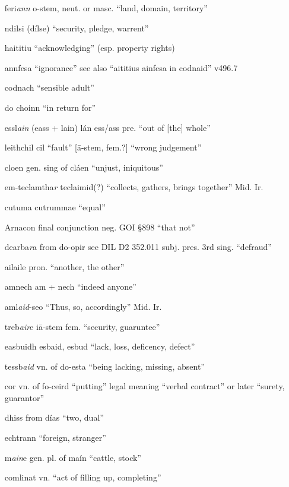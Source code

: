 \documentclass[11pt]{article}
\begin{document}
\begin{enumerate}
  \item[feri\emph{ann}] o-stem, neut. or masc. \enquote{land, domain, territory}
  \item[ndilsi] (d\'{i}lse) \enquote{security, pledge, warrent}
  \item[haititiu] \enquote{acknowledging} (esp. property rights)
  \item[annfesa] \enquote{ignorance} see also \enquote{aititius ainfesa in codnaid} v496.7
  \item[codnach] \enquote{sensible adult}
  \item[do choinn] \enquote{in return for}
  \item[essl\emph{ain}] (eass + lain) l\'{a}n ess/ass pre. \enquote{out of [the] whole}
  \item[leithchil] cil \enquote{fault} [\={a}-stem, fem.?] \enquote{wrong judgement}
  \item[cloen] gen. sing of cl\'{a}en \enquote{unjust, iniquitous}
  \item[em-teclamtha\emph{r}] teclaimid(?) \enquote{collects, gathers, brings together} Mid. Ir.
  \item[cutuma] cutrummae \enquote{equal}
  \item[Arnacon] final conjunction neg. GOI \S 898 \enquote{that not}
  \item[dearba\emph{r}a] from do-opir see DIL D2 352.011 subj. pres. 3rd sing. \enquote{defraud} 
  \item[ailaile] pron. \enquote{another, the other}
  \item[amnech] am + nech \enquote{indeed anyone} 
  \item[aml\emph{aid}-seo] \enquote{Thus, so, accordingly} Mid. Ir.
  \item[treb\emph{air}e] i\={a}-stem fem. \enquote{security, guaruntee}
  \item[easbuidh] esbaid, esbud \enquote{lack, loss, deficency, defect}
  \item[tessb\emph{aid}] vn. of do-esta \enquote{being lacking, missing, absent}
  \item[cor] vn. of fo-ceird \enquote{putting} legal meaning \enquote{verbal contract} or later \enquote{surety, guarantor}
  \item[dhiss] from d\'{i}as \enquote{two, dual}
  \item[echtrann] \enquote{foreign, stranger}
  \item[m\emph{ain}e] gen. pl. of ma\'{i}n \enquote{cattle, stock}
  \item[comlinat] vn. \enquote{act of filling up, completing}

\end{enumerate}
\end{document}
